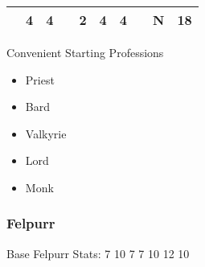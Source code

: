 \documentclass[12pt]{article}
\newcommand{\WviiTwoColumnSetup}{\raggedcolumns\RaggedRight}
\begin{document}
\begin{longtable}[]{@{}llllllllll@{}}
\begin{minipage}[t]{0.13\columnwidth}
\strut\end{minipage} &
\begin{minipage}[t]{0.06\columnwidth}\raggedright\strut
4
\strut\end{minipage} &
\begin{minipage}[t]{0.06\columnwidth}\raggedright\strut
4
\strut\end{minipage} &
\begin{minipage}[t]{0.06\columnwidth}\raggedright\strut
\strut\end{minipage} &
\begin{minipage}[t]{0.06\columnwidth}\raggedright\strut
2
\strut\end{minipage} &
\begin{minipage}[t]{0.06\columnwidth}\raggedright\strut
4
\strut\end{minipage} &
\begin{minipage}[t]{0.06\columnwidth}\raggedright\strut
4
\strut\end{minipage} &
\begin{minipage}[t]{0.06\columnwidth}\raggedright\strut
\strut\end{minipage} &
\begin{minipage}[t]{0.07\columnwidth}\raggedright\strut
N
\strut\end{minipage} &
\begin{minipage}[t]{0.08\columnwidth}\raggedright\strut
18
\strut\end{minipage}\tabularnewline
\bottomrule
\end{longtable}

Convenient Starting Professions

\begin{multicols}{2}\WviiTwoColumnSetup
\begin{itemize}
\item
  Priest
\item
  Bard
\item
  Valkyrie
\item
  Lord
\item
  Monk
\end{itemize}
\end{multicols}

\subsubsection{Felpurr}\label{felpurr}

Base Felpurr Stats: 7 10 7 7 10 12 10
\end{document}
